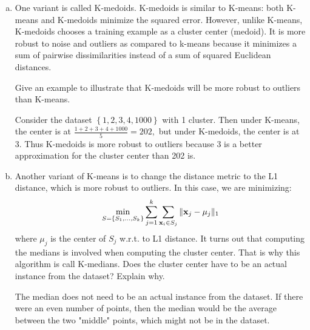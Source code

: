 \documentclass{article}
\newcommand{\vx}{{\bf x}}
\newcommand{\vxi}{{\bf x}_i}
\begin{document}
\begin{enumerate}[(a)]
\begin{proof}
			\begin{align*}
				\sum_{i=1}^{n} r_{ij}^{new} \left\lVert x_i-\mu_j^{new} \right\rVert=\sum_{x_i\in S_j}^{}\left\lVert x_i-\mu_j^{new} \right\rVert_2^2\le \sum_{x_i\in S_j}^{} \left\lVert x_i-\mu_j \right\rVert_2^2 = \sum_{i=1}^{n} r_{ij}^{new}\left\lVert x_i-\mu_j \right\rVert_2^2
			\end{align*}
			and thus
			\begin{align*}
				\sum_{j=1}^{k} \sum_{x_i\in S_j}^{} \left\lVert x_i-\mu_j^{new} \right\rVert_2^2= \sum_{j=1}^{k} \sum_{i=1}^{n} r_{ij}^{new} \left\lVert x_i-\mu_j^{new} \right\rVert &\le \sum_{j=1}^{k} \sum_{i=1}^{n} r_{ij}^{new} \left\lVert x_i-\mu_j \right\rVert_2^2
			\end{align*}
		\end{proof}

	\item One variant is called K-medoids. K-medoids is similar to K-means: both K-means and K-medoids minimize the squared error. However, unlike K-means, K-medoids chooses a training example as a cluster center (medoid). It is more robust to noise and outliers as compared to k-means because it minimizes a sum of pairwise dissimilarities instead of a sum of squared Euclidean distances. 

		Give an example to illustrate that K-medoids will be more robust to outliers than K-means.
		\begin{answer*}
			Consider the dataset $\left\{ 1, 2, 3, 4, 1000 \right\}$ with 1 cluster. Then under K-means, the center is at $\frac{1+2+3+4+1000}{5}=202,$ but under K-medoids, the center is at 3. Thus K-medoids is more robust to outliers because 3 is a better approximation for the cluster center than 202 is.
		\end{answer*}

	\item Another variant of K-means is to change the distance metric to the L1 distance, which is more robust to outliers. In this case, we are minimizing:
		\begin{align}
			\min_{S=\{S_1,...,S_k\}}\sum_{j=1}^k\sum_{\vxi\in S_j}\|\vx_j-\mu_j\|_1
		\end{align}
		where $\mu_j$ is the center of $S_j$ w.r.t. to L1 distance. It turns out that computing the medians is involved when computing the cluster center. That is why this algorithm is call K-medians. Does the cluster center have to be an actual instance from the dataset? Explain why.
		\begin{answer*}
			The median does not need to be an actual instance from the dataset. If there were an even number of points, then the median would be the average between the two "middle" points, which might not be in the dataset.
		\end{answer*}
\end{enumerate}
\end{document}

